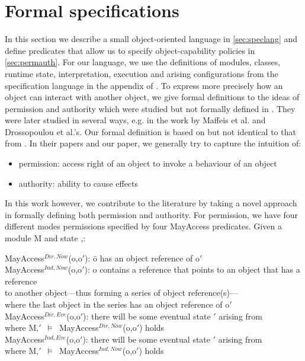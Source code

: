 \documentclass[a4paper,11pt,twoside]{article}
\newcommand{\losigma}{\text{$\upsigma$}}
\newcommand{\loturns} {$\vDash$}
\begin{document}
\section{Formal specifications}\label{sec:specs}
In this section we describe a small object-oriented language in \cref{sec:speclang} and define predicates that allow us to specify object-capability policies in \cref{sec:permauth}. For our language, we use the definitions of modules, classes, runtime state, interpretation, execution and arising configurations from the specification language in the appendix of \cite{drossopoulou2015b}. To express more precisely how an object can interact with another object, we give formal definitions to the ideas of permission and authority which were studied but not formally defined in \cite{miller2006}. They were later studied in several ways, e.g. in the work by Maffeis et al.\cite{maffeis2010} and Drossopoulou et al.'s\cite{drossopoulou2016}. Our formal definition is based on but not identical to that from  \cite{drossopoulou2016}. In their papers and our paper, we generally try to capture the intuition of:
\begin{itemize}
\item permission: access right of an object to invoke a behaviour of an object
\item authority: ability to cause effects
\end{itemize}
In this work however, we contribute to the literature by taking a novel approach in formally defining both permission and authority. For permission, we have four different modes permissions specified by four MayAccess predicates. Given a module M and state \losigma,:
\begin{tabbing}
MayAccess$^{Dir,Now}$(o,o$'$): \=o has an object reference of o$'$\\
MayAccess$^{Ind,Now}$(o,o$'$): o contains a reference that points to an object that has a reference\\
\>to another object---thus forming a series of object reference(s)---\\ \> where the last object in the series has an object reference of o$'$\\
MayAccess$^{Dir,Eve}$(o,o$'$): there will be some eventual state \losigma$'$ arising from \losigma\,\\ \> where M,\losigma$'$\ \loturns\ MayAccess$^{Dir,Now}$(o,o$'$) holds\\
MayAccess$^{Ind,Eve}$(o,o$'$): there will be some eventual state \losigma$'$ arising from \losigma\,\\ \> where M,\losigma$'$\ \loturns\ MayAccess$^{Ind,Now}$(o,o$'$) holds\\
\end{tabbing}
\end{document}

